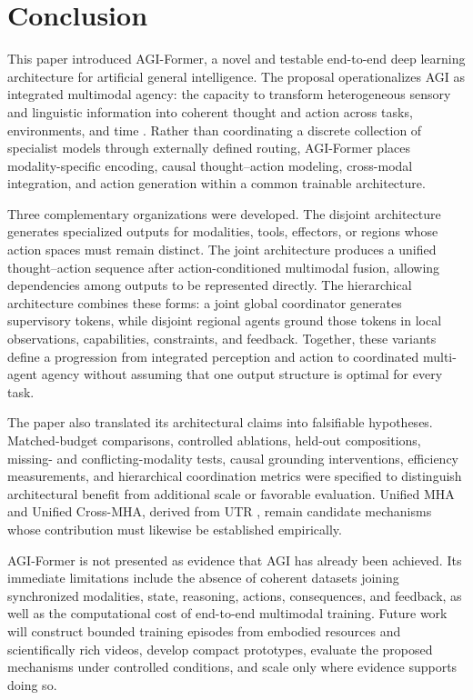 \section{\textbf{Conclusion}}

This paper introduced AGI-Former, a novel and testable end-to-end deep learning architecture for artificial general intelligence. The proposal operationalizes AGI as integrated multimodal agency: the capacity to transform heterogeneous sensory and linguistic information into coherent thought and action across tasks, environments, and time \cite{zohourian2026agi}. Rather than coordinating a discrete collection of specialist models through externally defined routing, AGI-Former places modality-specific encoding, causal thought--action modeling, cross-modal integration, and action generation within a common trainable architecture.

Three complementary organizations were developed. The disjoint architecture generates specialized outputs for modalities, tools, effectors, or regions whose action spaces must remain distinct. The joint architecture produces a unified thought--action sequence after action-conditioned multimodal fusion, allowing dependencies among outputs to be represented directly. The hierarchical architecture combines these forms: a joint global coordinator generates supervisory tokens, while disjoint regional agents ground those tokens in local observations, capabilities, constraints, and feedback. Together, these variants define a progression from integrated perception and action to coordinated multi-agent agency without assuming that one output structure is optimal for every task.

The paper also translated its architectural claims into falsifiable hypotheses. Matched-budget comparisons, controlled ablations, held-out compositions, missing- and conflicting-modality tests, causal grounding interventions, efficiency measurements, and hierarchical coordination metrics were specified to distinguish architectural benefit from additional scale or favorable evaluation. Unified MHA and Unified Cross-MHA, derived from UTR \cite{zohourian2026utr}, remain candidate mechanisms whose contribution must likewise be established empirically.

AGI-Former is not presented as evidence that AGI has already been achieved. Its immediate limitations include the absence of coherent datasets joining synchronized modalities, state, reasoning, actions, consequences, and feedback, as well as the computational cost of end-to-end multimodal training. Future work will construct bounded training episodes from embodied resources and scientifically rich videos, develop compact prototypes, evaluate the proposed mechanisms under controlled conditions, and scale only where evidence supports doing so.

